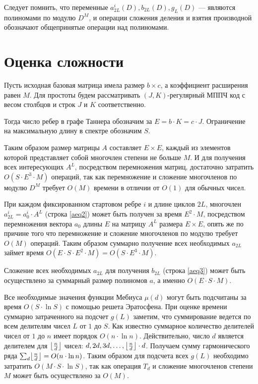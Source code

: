 Следует помнить, что переменные $a_{2L}^i(D), b_{2L}(D), g_L(D)$ ---
являются полиномами по модулю $D^M$, и операции сложения деления
и взятия производной обозначают общепринятые операции над
полиномами.

\section{Оценка сложности}

 Пусть исходная базовая  матрица имела размер $b \times c$, а коэффициент расширения равен $M$.
Для простоты будем рассматривать $(J,K)$-регулярный МППЧ код с 
весом столбцов и строк $J$ и $K$ соответственно. 

Тогда число ребер в графе Таннера обозначим за $E=b \cdot K = c \cdot J$.
Ограничение на максимальную длину в спектре обозначим $S$.

Таким образом размер матрицы $A$ составляет $E \times E$, каждый из элементов которой представляет
собой многочлен степени не больше $M$. И для получения
всех интересующих $A^L$, посредством перемножения матриц,
достаточно затратить $O(S \cdot E^3 \cdot M)$ операций, так как перемножение и сложение многочленов по модулю $D^M$
требует $O(M)$ времени в отличии от $O(1)$ для обычных чисел.

При каждом фиксированном стартовом ребре $i$ и длине циклов $2L$, многочлен $a_{2L}^i=a_0^i \cdot A^L$ (строка \ref{aeq2})
может быть получен за время $E^2 \cdot M$, посредством перемножения вектора $a_0$ длины $E$ на матрицу
$A^L$ размера $E \times E$, опять же по причине того что перемножение и сложение многочленов по модулю 
требует $O(M)$ операций. Таким образом суммарно получение всех необходимых $a_{2L}$ займет
 время $O(E \cdot S \cdot E^2 \cdot M) = O(S \cdot E^3 \cdot M)$.

Сложение всех необходимых $a_{2L}$ для получения $b_{2L}$ (строка \ref{aeq3}) может быть осуществлено за суммарный размер 
полиномов $a$, а именно $O(E \cdot S \cdot M)$.

Все необходимые значения функции Мебиуса $\mu(d)$ могут быть подсчитаны за время $O(S \cdot \ln S)$ с
помощью решета Эратосфена. При оценке времени суммарно затраченного на подсчет $g(L)$ заметим,
 что суммирование ведется по всем делителям чисел $L$ от $1$ до $S$. Как известно суммарное количество
делителей чисел от $1$ до $n$ имеет порядок $O(n \cdot \ln n)$. Действительно, число $d$ является 
делителем для $\floor*{\frac{n}{d}}$ чисел: $d, 2d, 3d, \ldots, \floor*{\frac{n}{d}} \cdot d$. Получаем сумму гармонического ряда
 $\sum_d \floor*{\frac{n}{d}} = O(n \cdot \ln n)$. Таким образом для подсчета всех $g(L)$ необходимо затратить $O(M \cdot S \cdot \ln S)$,
так как операция $T_d$ и сложение многочленов степени $M$ может быть осуществлено за $O(M)$.

